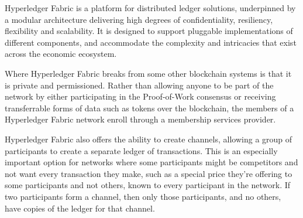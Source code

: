 Hyperledger Fabric is a platform for distributed ledger solutions, underpinned by a modular architecture delivering high degrees of confidentiality, resiliency, flexibility and scalability. It is designed to support pluggable implementations of different components, and accommodate the complexity and intricacies that exist across the economic ecosystem.

Where Hyperledger Fabric breaks from some other blockchain systems is that it is private and permissioned. Rather than allowing anyone to be part of the network by either participating in the Proof-of-Work consensus or receiving transferrable forms of data such as tokens over the blockchain, the members of a Hyperledger Fabric network enroll through a membership services provider.

Hyperledger Fabric also offers the ability to create channels, allowing a group of participants to create a separate ledger of transactions. This is an especially important option for networks where some participants might be competitors and not want every transaction they make, such as a special price they’re offering to some participants and not others, known to every participant in the network. If two participants form a channel, then only those participants, and no others, have copies of the ledger for that channel.
